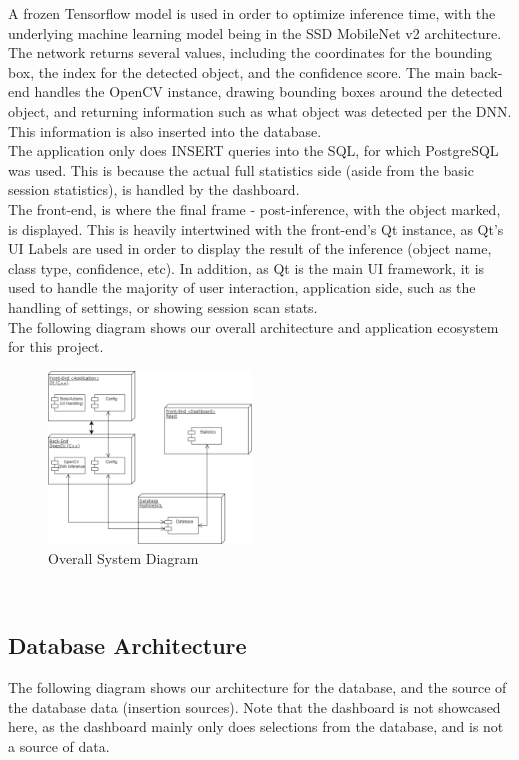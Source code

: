 \documentclass[conference]{IEEEtran}
\begin{document}
A frozen Tensorflow model is used in order to optimize inference time, with the underlying machine learning model being in the SSD MobileNet v2 architecture. The network returns several values, including the coordinates for the bounding box, the index for the detected object, and the confidence score. The main back-end handles the OpenCV instance, drawing bounding boxes around the detected object, and returning information such as what object was detected per the DNN. This information is also inserted into the database.\\

The application only does INSERT queries into the SQL, for which PostgreSQL was used. This is because the actual full statistics side (aside from the basic session statistics), is handled by the dashboard.\\

The front-end, is where the final frame - post-inference, with the object marked, is displayed. This is heavily intertwined with the front-end's Qt instance, as Qt's UI Labels are used in order to display the result of the inference (object name, class type, confidence, etc). In addition, as Qt is the main UI framework, it is used to handle the majority of user interaction, application side, such as the handling of settings, or showing session scan stats.\\

The following diagram shows our overall architecture and application ecosystem for this project.\\

\begin{figure}[h]
    \centering
    \includegraphics[width=0.48\textwidth]{images/app_diagram.eps}
    \caption{Overall System Diagram}
\end{figure}~\\

\subsection{Database Architecture}
The following diagram shows our architecture for the database, and the source of the database data (insertion sources). Note that the dashboard is not showcased here, as the dashboard mainly only does selections from the database, and is not a source of data.
\end{document}

